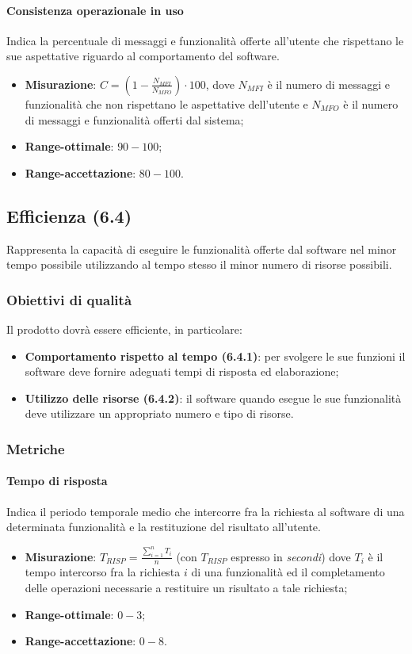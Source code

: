 \begin{itemize}
\paragraph{Consistenza operazionale in uso}
Indica la percentuale di messaggi e funzionalità offerte all'utente che rispettano le sue aspettative riguardo al comportamento del software.
\begin{itemize}
\item \textbf{Misurazione}: $C=(1-\frac{N_{MFI}}{N_{MFO}}) \cdot 100$, dove $N_{MFI}$ è il numero di messaggi e funzionalità che non rispettano le aspettative dell'utente e $N_{MFO}$ è il numero di messaggi e funzionalità offerti dal sistema;
\item \textbf{Range-ottimale}: $90 - 100$;
\item \textbf{Range-accettazione}: $80 - 100$.
\end{itemize}

\subsection{Efficienza (6.4)}
\label{efficienza}
Rappresenta la capacità di eseguire le funzionalità offerte dal software nel minor tempo possibile utilizzando al tempo stesso il minor numero di risorse possibili.
\subsubsection{Obiettivi di qualità}
Il prodotto dovrà essere efficiente, in particolare:
\begin{itemize}
\item \textbf{Comportamento rispetto al tempo (6.4.1)}:  per svolgere le sue funzioni il software deve fornire adeguati tempi di risposta ed elaborazione;
\item \textbf{Utilizzo delle risorse (6.4.2)}: il software quando esegue le sue funzionalità deve utilizzare un appropriato numero e tipo di risorse.
\end{itemize}
\subsubsection{Metriche}
\paragraph{Tempo di risposta}
Indica il periodo temporale medio che intercorre fra la richiesta al software di una determinata funzionalità e la restituzione del risultato all'utente.
\begin{itemize}
\item \textbf{Misurazione}: $T_{RISP} = \frac{\sum_{i=1}^{n} T_{i}}{n}$ (con $T_{RISP}$ espresso in \textit{secondi}) dove $T_{i}$ è il tempo intercorso fra la richiesta $i$ di una funzionalità ed il completamento delle operazioni necessarie a restituire un risultato a tale richiesta;
\item \textbf{Range-ottimale}: $0 - 3$;
\item \textbf{Range-accettazione}: $0 - 8$.
\end{itemize}


\end{itemize}
